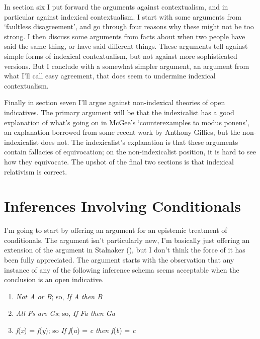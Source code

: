 \documentclass[
  11pt,
  letterpaper,
  DIV=11,
  numbers=noendperiod,
  twoside]{scrartcl}
\providecommand{\tightlist}{%
  \setlength{\itemsep}{0pt}\setlength{\parskip}{0pt}}
\begin{document}
In section six I put forward the arguments against contextualism, and in
particular against indexical contextualism. I start with some arguments
from `faultless disagreement', and go through four reasons why these
might not be too strong. I then discuss some arguments from facts about
when two people have said the same thing, or have said different things.
These arguments tell against simple forms of indexical contextualism,
but not against more sophisticated versions. But I conclude with a
somewhat simpler argument, an argument from what I'll call easy
agreement, that does seem to undermine indexical contextualism.

Finally in section seven I'll argue against non-indexical theories of
open indicatives. The primary argument will be that the indexicalist has
a good explanation of what's going on in McGee's `counterexamples to
modus ponens', an explanation borrowed from some recent work by Anthony
Gillies, but the non-indexicalist does not. The indexicalist's
explanation is that these arguments contain fallacies of equivocation;
on the non-indexicalist position, it is hard to see how they equivocate.
The upshot of the final two sections is that indexical relativism is
correct.

\section{Inferences Involving
Conditionals}\label{inferences-involving-conditionals}

I'm going to start by offering an argument for an epistemic treatment of
conditionals. The argument isn't particularly new, I'm basically just
offering an extension of the argument in Stalnaker
(), but I don't think the force
of it has been fully appreciated. The argument starts with the
observation that any instance of any of the following inference schema
seems acceptable when the conclusion is an open indicative.

\begin{enumerate}
\def\labelenumi{\arabic{enumi}.}
\tightlist
\item
  \emph{Not A or B}; so, \emph{If A then B}
\item
  \emph{All Fs are Gs}; so, \emph{If Fa then Ga}
\item
  \emph{f}(\emph{x}) = \emph{f}(\emph{y}); so \emph{If f}(\emph{a}) =
  \emph{c} \emph{then f}(\emph{b}) = \emph{c}
\end{enumerate}
\end{document}
